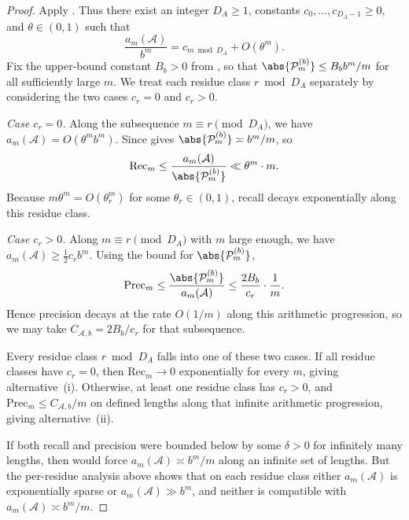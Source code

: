 \begin{proof}
  Apply . Thus there exist an integer
  \(D_A\ge 1\), constants \(c_0,\dots,c_{D_A-1}\ge 0\), and
  \(\theta\in(0,1)\) such that
  \[
    \frac{a_m(\mathcal A)}{b^m}=c_{m\bmod D_A}+O(\theta^m).
  \]
  Fix the upper-bound constant \(B_b>0\) from
  , so that
  \(\abs{\mathcal P_m^{(b)}}\le B_b b^m/m\) for all sufficiently large
  \(m\).
  We treat each residue class \(r\bmod D_A\) separately by considering the
  two cases \(c_r=0\) and \(c_r>0\).

  \textit{Case \(c_r=0\).}
  Along the subsequence \(m\equiv r\pmod {D_A}\), we have
  \(a_m(\mathcal A)=O(\theta^m b^m)\). Since
   gives
  \(\abs{\mathcal P_m^{(b)}}\asymp b^m/m\), so
  \[
    \mathrm{Rec}_m
    \le \frac{a_m(\mathcal A)}{\abs{\mathcal P_m^{(b)}}}
    \ll \theta^m\cdot m.
  \]
  Because \(m\theta^m=O(\theta_r^m)\) for some \(\theta_r\in(0,1)\),
  recall decays exponentially along this residue class.

  \textit{Case \(c_r>0\).}
  Along \(m\equiv r\pmod {D_A}\) with \(m\) large enough, we have
  \(a_m(\mathcal A)\ge \tfrac{1}{2}c_r b^m\). Using the bound for
  \(\abs{\mathcal P_m^{(b)}}\),
  \[
    \mathrm{Prec}_m
    \le \frac{\abs{\mathcal P_m^{(b)}}}{a_m(\mathcal A)}
    \le \frac{2B_b}{c_r}\cdot\frac{1}{m}.
  \]
  Hence precision decays at the rate \(O(1/m)\) along this
  arithmetic progression, so we may take
  \(C_{\mathcal A,b}=2B_b/c_r\) for that subsequence.

  Every residue class \(r\bmod D_A\) falls into one of these two cases.
  If all residue classes have \(c_r=0\), then
  \(\mathrm{Rec}_m\to 0\) exponentially for every \(m\), giving
  alternative~\textup{(i)}. Otherwise, at least one residue class has
  \(c_r>0\), and \(\mathrm{Prec}_m\le C_{\mathcal A,b}/m\) on defined
  lengths along that infinite arithmetic progression, giving
  alternative~\textup{(ii)}.

  If both recall and precision were bounded below by some
  \(\delta>0\) for infinitely many lengths, then
   would force
  \(a_m(\mathcal A)\asymp b^m/m\) along an infinite set of lengths. But the
  per-residue analysis above shows that on each residue class either
  \(a_m(\mathcal A)\) is exponentially sparse or \(a_m(\mathcal A)\gg b^m\), and
  neither is compatible with \(a_m(\mathcal A)\asymp b^m/m\).
\end{proof}
